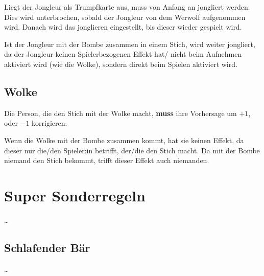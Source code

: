 \documentclass[3pt]{article}
\begin{document}
Liegt der Jongleur als Trumpfkarte aus, muss von Anfang an jongliert werden.
Dies wird unterbrochen, sobald der Jongleur von dem Werwolf aufgenommen wird.
Danach wird das jonglieren eingestellt, bis dieser wieder gespielt wird.

Ist der Jongleur mit der Bombe zusammen in einem Stich, wird weiter jongliert, da der Jongleur keinen Spielerbezogenen Effekt hat/ nicht beim Aufnehmen aktiviert wird (wie die Wolke), sondern direkt beim Spielen aktiviert wird.

\subsection{Wolke}
Die Person, die den Stich mit der Wolke macht, \textbf{muss} ihre Vorhersage um $+1$, oder $-1$ korrigieren.

Wenn die Wolke mit der Bombe zusammen kommt, hat sie keinen Effekt, da dieser nur die/den Spieler:in betrifft, der/die den Stich macht.
Da mit der Bombe niemand den Stich bekommt, trifft dieser Effekt auch niemanden.


\section{Super Sonderregeln}
\ldots

\subsection{Schlafender Bär}
\ldots
\end{document}
